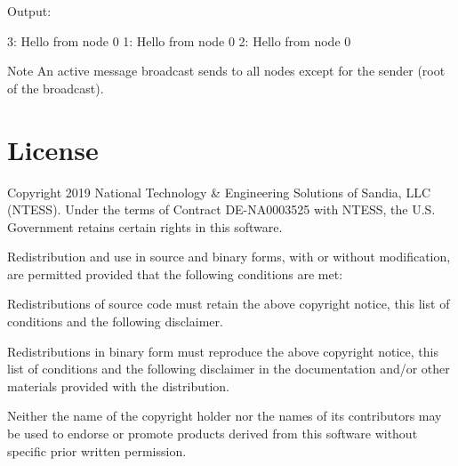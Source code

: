 

Output\+: 
\begin{DoxyCode}
3: Hello from node 0
1: Hello from node 0
2: Hello from node 0
\end{DoxyCode}


\begin{DoxyNote}{Note}
An active message broadcast sends to all nodes except for the sender (root of the broadcast). 
\end{DoxyNote}
\hypertarget{introduction_License}{}\section{License}\label{introduction_License}


Copyright 2019 National Technology \& Engineering Solutions of Sandia, L\+LC (N\+T\+E\+SS). Under the terms of Contract D\+E-\/\+N\+A0003525 with N\+T\+E\+SS, the U.\+S. Government retains certain rights in this software.

Redistribution and use in source and binary forms, with or without modification, are permitted provided that the following conditions are met\+:


\begin{DoxyItemize}
\item Redistributions of source code must retain the above copyright notice, this list of conditions and the following disclaimer.
\item Redistributions in binary form must reproduce the above copyright notice, this list of conditions and the following disclaimer in the documentation and/or other materials provided with the distribution.
\item Neither the name of the copyright holder nor the names of its contributors may be used to endorse or promote products derived from this software without specific prior written permission.
\end{DoxyItemize}

